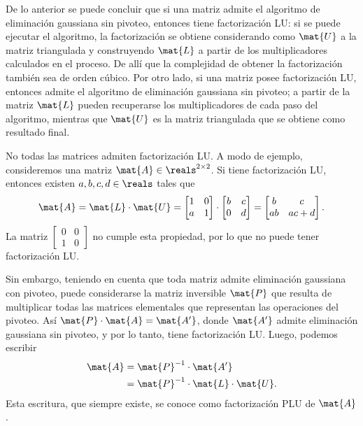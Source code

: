 De lo anterior se puede concluir que si una matriz admite el algoritmo de
eliminación gaussiana sin pivoteo, entonces tiene factorización LU: si se
puede ejecutar el algoritmo, la factorización se obtiene considerando como
$\mat{U}$ a la matriz triangulada y construyendo $\mat{L}$ a partir de los
multiplicadores calculados en el proceso. De allí que la complejidad de
obtener la factorización también sea de orden cúbico. Por otro lado, si una
matriz posee factorización LU, entonces admite el algoritmo de eliminación
gaussiana sin pivoteo; a partir de la matriz $\mat{L}$ pueden recuperarse los
multiplicadores de cada paso del algoritmo, mientras que $\mat{U}$ es la
matriz triangulada que se obtiene como resultado final.

No todas las matrices admiten factorización LU. A modo de ejemplo,
consideremos una matriz $\mat{A} \in \reals^{2 \times 2}$. Si tiene
factorización LU, entonces existen $a, b, c, d \in \reals$ tales que
\[ \mat{A} = \mat{L} \cdot \mat{U} = \begin{bmatrix}
        1 & 0 \\
        a & 1
    \end{bmatrix} \cdot \begin{bmatrix}
        b & c \\
        0 & d
    \end{bmatrix} = \begin{bmatrix}
        b  & c    \\
        ab & ac+d
    \end{bmatrix}. \]
La matriz $\begin{bmatrix} 0 & 0 \\ 1 & 0 \end{bmatrix}$ no cumple esta
propiedad, por lo que no puede tener factorización LU.

Sin embargo, teniendo en cuenta que toda matriz admite eliminación gaussiana
con pivoteo, puede considerarse la matriz inversible $\mat{P}$ que resulta de
multiplicar todas las matrices elementales que representan las operaciones
del pivoteo.
Así $\mat{P} \cdot \mat{A} = \mat{A'}$, donde $\mat{A'}$ admite eliminación
gaussiana sin pivoteo, y por lo tanto, tiene factorización LU.
Luego, podemos escribir
\[ \begin{aligned}
    \mat{A}
    &= \mat{P}^{-1} \cdot \mat{A'} \\
    &= \mat{P}^{-1} \cdot \mat{L} \cdot \mat{U}.
\end{aligned} \]
Esta escritura, que siempre existe, se conoce como factorización PLU
de $\mat{A}$.

